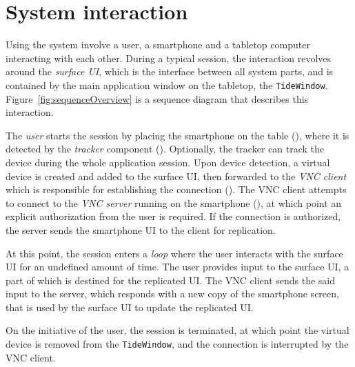 \section{System interaction}

Using the system involve a user, a smartphone and a tabletop computer interacting with each other.
During a typical session, the interaction revolves around the \emph{surface UI}, which is the interface between all system parts, and is contained by the main application window on the tabletop, the \texttt{TideWindow}.
Figure~\ref{fig:sequenceOverview} is a sequence diagram that describes this interaction.

The \emph{user} starts the session by placing the smartphone on the table (), where it is detected by the \emph{tracker} component ().
Optionally, the tracker can track the device during the whole application session.
Upon device detection, a virtual device is created and added to the surface UI, then forwarded to the \emph{VNC client} which is responsible for establishing the connection ().
The VNC client attempts to connect to the \emph{VNC server} running on the smartphone (), at which point an explicit authorization from the user is required.
If the connection is authorized, the server sends the smartphone UI to the client for replication.

At this point, the session enters a \emph{loop} where the user interacts with the surface UI for an undefined amount of time.
The user provides input to the surface UI, a part of which is destined for the replicated UI.
The VNC client sends the said input to the server, which responds with a new copy of the smartphone screen, that is used by the surface UI to update the replicated UI.

On the initiative of the user, the session is terminated, at which point the virtual device is removed from the \texttt{TideWindow}, and the connection is interrupted by the VNC client.


